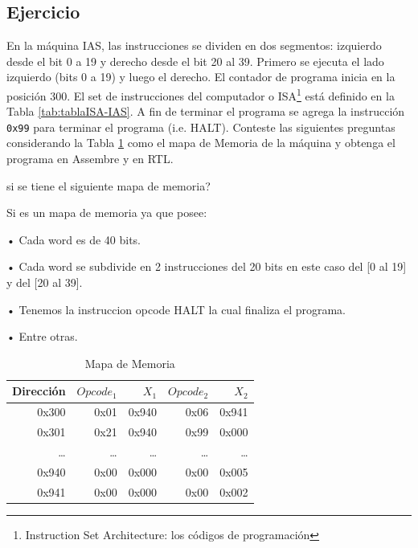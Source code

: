 \documentclass{article}
\begin{document}
\newpage

\subsection{Ejercicio}
\label{sec:org9a57614}

En la máquina IAS, las instrucciones se dividen en dos segmentos:
izquierdo desde el bit 0 a 19 y derecho desde el bit 20 al 39. Primero
se ejecuta el lado izquierdo (bits 0 a 19) y luego el derecho. El
contador de programa inicia en la posición 300. El set de
instrucciones del computador o ISA\footnote{Instruction Set Architecture: los códigos de programación} está definido en la Tabla
\ref{tab:tablaISA-IAS}. A fin de terminar el programa se agrega la
instrucción \texttt{0x99} para terminar el programa (i.e. HALT). Conteste las
siguientes preguntas considerando la Tabla \ref{tab:orgcd9552c} como el
mapa de Memoria de la máquina y obtenga el programa en Assembre y en
RTL.

si se tiene el siguiente mapa de memoria?

Si es un mapa de memoria ya que posee:

• Cada word es de 40 bits.

• Cada word se subdivide en 2 instrucciones del 20 bits
   en este caso del [0 al 19] y del [20 al 39].

• Tenemos la instruccion opcode HALT la cual finaliza el programa.

• Entre otras.

\begin{table}[htbp]
\caption{\label{tab:orgcd9552c}Mapa de Memoria}
\centering
\begin{tabular}{rrrrr}
\hline
Dirección & \(Opcode_1\) & \(X_1\) & \(Opcode_2\) & \(X_2\)\\[0pt]
\hline
0x300 & 0x01 & 0x940 & 0x06 & 0x941\\[0pt]
0x301 & 0x21 & 0x940 & 0x99 & 0x000\\[0pt]
\ldots{} & \ldots{} & \ldots{} & \ldots{} & \ldots{}\\[0pt]
0x940 & 0x00 & 0x000 & 0x00 & 0x005\\[0pt]
0x941 & 0x00 & 0x000 & 0x00 & 0x002\\[0pt]
\hline
\end{tabular}
\end{table}
\end{document}
